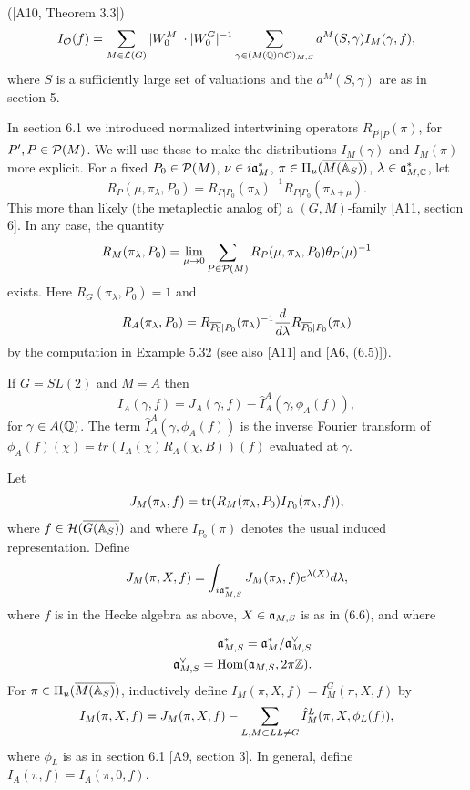 \begin{proposition}
([A10, Theorem 3.3]) 
\[
I_{{\cal{O}}}(f)
=\sum_{M\in {\cal{L}}(G)}|W_0^M|\cdot |W_0^G|^{-1}
\sum_{\gamma \in (M({\Bbb{Q}})\cap {\cal{O}})_{M,S}}
a^M(S,\gamma )I_M(\gamma ,f),
\]
where $S$ is a sufficiently large set of valuations and the
$a^M(S,\gamma)$ are as in section 5.
\end{proposition}

In section 6.1 we introduced normalized intertwining operators
$R_{P^{\prime}|P}(\pi)$, for $P^{\prime},P\in {\cal P}(M)$.
We will use these to make the distributions
$I_M(\gamma)$ and $I_M(\pi)$ more explicit.
For a fixed $P_0\in {\cal P}(M)$,
$\nu\in i{\frak{a}}_M^*$,
$\pi\in \Pi_u(\overline{M({\Bbb{A}}_S)})$,
$\lambda\in {\frak{a}}_{M,{\Bbb{C}}}^*$, let
\begin{equation}
R_P(\mu,\pi_\lambda,P_0)
=R_{P|P_0}(\pi_\lambda)^{-1}R_{P|P_0}(\pi_{\lambda+\mu}) .
\end{equation}
This more than likely (the metaplectic analog of) a
$(G,M)$-family [A11, section 6]. In any case, the quantity
\[
R_M(\pi_\lambda,P_0)
=\lim_{\mu\rightarrow 0}
\sum_{P\in {\cal P}(M)}
R_P(\mu,\pi_\lambda,P_0)\theta_P(\mu)^{-1}
\]
exists. Here $R_G(\pi_\lambda,P_0)=1$ and
\[
R_A(\pi_\lambda,P_0)=
R_{\overline{P_0}|P_0}(\pi_\lambda)^{-1}
{d\over d\lambda}
R_{\overline{P_0}|P_0}(\pi_\lambda)
\]
by the computation in Example 5.32 (see also [A11] and [A6, (6.5)]).

\begin{example}
If $G=SL(2)$ and $M=A$ then
\[
I_A(\gamma,f)
=J_A(\gamma,f)-
\hat{I}_A^A(\gamma,\phi_A(f)),
\]
for $\gamma\in A({\Bbb{Q}})$.
The term $\hat{I}_A^A(\gamma,\phi_A(f))$
is the inverse Fourier transform of
$\phi_A(f)(\chi)=tr(I_A(\chi)R_A(\chi,B))(f)$ evaluated at
$\gamma$. 
\end{example}

Let
\begin{equation}
J_M(\pi_\lambda,f)=
{\rm tr}(R_M(\pi_\lambda,P_0)
I_{P_0}(\pi_\lambda,f)),
\end{equation}
where $f\in {\cal{H}}(\overline{G({\Bbb{A}}_S)})$ and where
$I_{P_0}(\pi)$ denotes the usual induced representation.
Define
\begin{equation}
J_M(\pi,X,f)
=\int_{i{\frak{a}}^*_{M,S}}
J_M(\pi_\lambda,f)e^{\lambda(X)}d\lambda,
\end{equation}
where $f$ is in the Hecke algebra as above, $X\in {\frak{a}}_{M,S}$
is as in (6.6), and where

\begin{eqnarray*}
&&{\frak{a}}^*_{M,S}
={\frak{a}}^*_{M}/{\frak{a}}^{\vee}_{M,S}\\
&&{\frak{a}}^{\vee}_{M,S}={\rm Hom}({\frak{a}}_{M,S},2\pi {\Bbb Z}).
\end{eqnarray*}
For
$\pi\in \Pi_u(\overline{M({\Bbb{A}}_S)})$,
inductively define $I_M(\pi,X,f)=I_M^G(\pi,X,f)$ by
\begin{equation}
I_M(\pi,X,f)
=J_M(\pi,X,f)-
\sum_{ L, M\subset L\\ L\not= G}
\hat{I}_M^L(\pi,X,\phi_L(f)),
\end{equation}
where $\phi_L$ is as in section 6.1 [A9, section 3].
In general, define $I_A(\pi,f)=I_A(\pi,0,f)$.


